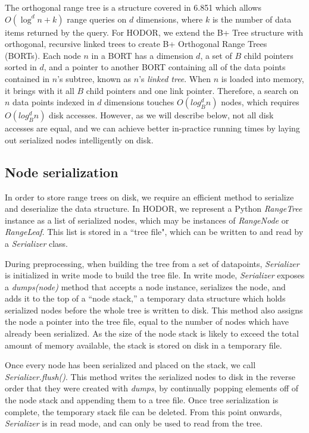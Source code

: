 \documentclass[11pt, oneside]{article}
\newcommand{\ms}{\textit}
\begin{document}
The orthogonal range tree is a structure covered in 6.851 which allows $O(\log^d
n + k)$ range queries on $d$ dimensions, where $k$ is the number of data items
returned by the query. For HODOR, we extend the B+ Tree structure with
orthogonal, recursive linked trees to create B+ Orthogonal Range Trees (BORTs).
Each node $n$ in a BORT has a dimension $d$, a set of $B$ child pointers sorted
in $d$, and a pointer to another BORT containing all of the data points
contained in $n$'s subtree, known as $n$'s \textit{linked tree}. When $n$ is
loaded into memory, it brings with it all $B$ child pointers and one link
pointer. Therefore, a search on $n$ data points indexed in $d$ dimensions
touches $O(log^d_B n)$ nodes, which requires $O(log^d_B n)$ disk accesses.
However, as we will describe below, not all disk accesses are equal, and we can
achieve better in-practice running times by laying out serialized nodes
intelligently on disk.

\subsection{Node serialization}

In order to store range trees on disk, we require an efficient method to
serialize and deserialize the data structure. In HODOR, we represent a Python
\ms{RangeTree} instance as a list of serialized nodes, which may be instances of
\ms{RangeNode} or \ms{RangeLeaf}. This list is stored in a ``tree file", which
can be written to and read by a \ms{Serializer} class. 

During preprocessing, when building the tree from a set of datapoints,
\ms{Serializer} is initialized in write mode to build the tree file. In write
mode, \ms{Serializer} exposes a \ms{dumps(node)} method that accepts a
node instance, serializes the node, and adds it to the top of a ``node stack,''
a temporary data structure which holds serialized nodes before the whole tree is
written to disk. This method also assigns the node a pointer into the tree file,
equal to the number of nodes which have already been serialized. As the size of
the node stack is likely to exceed the total amount of memory available, the
stack is stored on disk in a temporary file. 

Once every node has been serialized and placed on the stack, we call
\ms{Serializer.flush()}. This method writes the serialized nodes to disk in the
reverse order that they were created with \ms{dumps}, by continually popping
elements off of the node stack and appending them to a tree file. Once tree
serialization is complete, the temporary stack file can be deleted. From this
point onwards, \ms{Serializer} is in read mode, and can only be used to read
from the tree.
\end{document}
